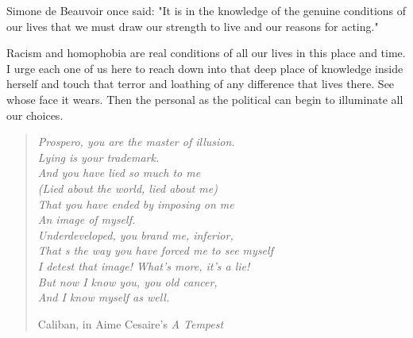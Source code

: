 \documentclass{article}
\begin{document}
Simone de Beauvoir once said: "It is in the knowledge of the genuine conditions of our lives that we must draw our strength to live and our reasons for acting." 

Racism and homophobia are real conditions of all our lives in this place and time. I urge each one of us here to reach down into that deep place of knowledge inside herself and touch that terror and loathing of any difference that lives there. See whose face it wears. Then the personal as the political can begin to illuminate all our choices. 

\begin{quote}
	\textit{
		Prospero, you are the master of illusion.       \\
		Lying is your trademark.                        \\
		And you have lied so much to me                 \\
		(Lied about the world, lied about me)           \\
		That you have ended by imposing on me           \\
		An image of myself.                             \\
		Underdeveloped, you brand me, inferior,         \\
		That s the way you have forced me to see myself \\
		I detest that image! What's more, it's a lie!   \\
		But now I know you, you old cancer,             \\
		And I know myself as well.                      \\
	}

	Caliban, in Aime Cesaire's \textit{A Tempest}
\end{quote}
\end{document}
